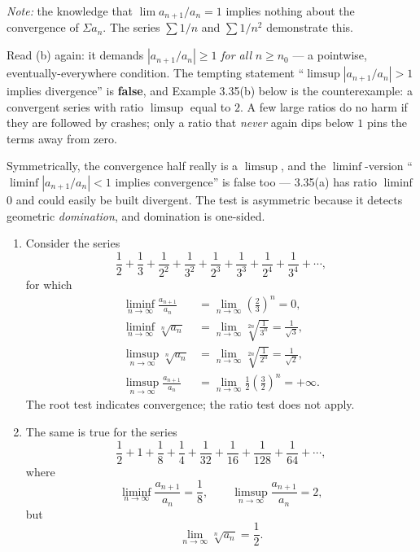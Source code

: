 \emph{Note:} the knowledge that $\lim a_{n+1}/a_n = 1$ implies nothing about
the convergence of $\Sigma a_n$. The series $\sum 1/n$ and $\sum 1/n^2$
demonstrate this.

\begin{pitfall}
Read (b) again: it demands $|a_{n+1}/a_n| \ge 1$ \emph{for all} $n \ge n_0$
--- a pointwise, eventually-everywhere condition. The tempting statement
``$\limsup |a_{n+1}/a_n| > 1$ implies divergence'' is \textbf{false}, and
Example 3.35(b) below is the counterexample: a convergent series with ratio
$\limsup$ equal to $2$. A few large ratios do no harm if they are followed by
crashes; only a ratio that \emph{never} again dips below $1$ pins the terms
away from zero.

Symmetrically, the convergence half really is a $\limsup$, and the
$\liminf$-version ``$\liminf |a_{n+1}/a_n| < 1$ implies convergence'' is false
too --- 3.35(a) has ratio $\liminf$ $0$ and could easily be built divergent.
The test is asymmetric because it detects geometric \emph{domination}, and
domination is one-sided.
\end{pitfall}

\begin{enumerate}[label=(\alph*), leftmargin=2.2em, itemsep=4pt, topsep=4pt]
  \item Consider the series
        \[ \frac12 + \frac13 + \frac{1}{2^2} + \frac{1}{3^2} + \frac{1}{2^3}
           + \frac{1}{3^3} + \frac{1}{2^4} + \frac{1}{3^4} + \cdots, \]
        for which
        \begin{align*}
          \liminf_{n\to\infty} \frac{a_{n+1}}{a_n}
            &= \lim_{n\to\infty}\left(\frac23\right)^n = 0,\\
          \liminf_{n\to\infty} \sqrt[n]{a_n}
            &= \lim_{n\to\infty}\sqrt[2n]{\frac{1}{3^n}} = \frac{1}{\sqrt3},\\
          \limsup_{n\to\infty} \sqrt[n]{a_n}
            &= \lim_{n\to\infty}\sqrt[2n]{\frac{1}{2^n}} = \frac{1}{\sqrt2},\\
          \limsup_{n\to\infty} \frac{a_{n+1}}{a_n}
            &= \lim_{n\to\infty}\frac12\left(\frac32\right)^n = +\infty.
        \end{align*}
        The root test indicates convergence; the ratio test does not
        apply.
  \item The same is true for the series
        \[ \frac12 + 1 + \frac18 + \frac14 + \frac{1}{32} + \frac{1}{16}
           + \frac{1}{128} + \frac{1}{64} + \cdots, \]
        where
        \[ \liminf_{n\to\infty} \frac{a_{n+1}}{a_n} = \frac18, \qquad
           \limsup_{n\to\infty} \frac{a_{n+1}}{a_n} = 2, \]
        but
        \[ \lim_{n\to\infty} \sqrt[n]{a_n} = \frac12. \]
\end{enumerate}

